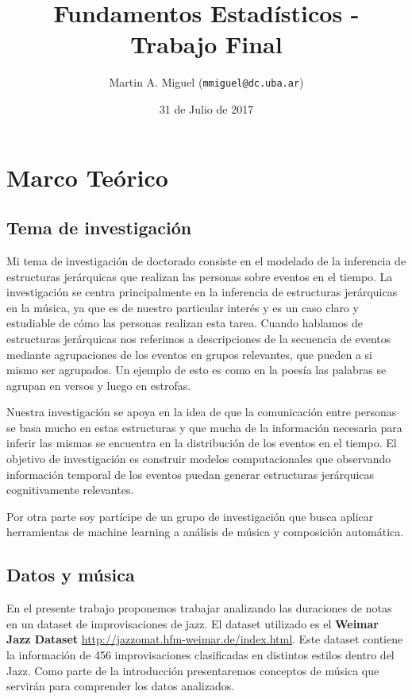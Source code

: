 \documentclass{article}
\title{Fundamentos Estadísticos - Trabajo Final}
\author{Martin A. Miguel (\texttt{mmiguel@dc.uba.ar})}
\affil{Lic. en Cs de la Computación - Laboratorio de Inteligencia Artificial
Aplicada, Depto. de Computación, Fac. de Cs. Exactas y Naturales, Univ. de
Buenos Aires, Buenos Aires, Argentina}
\date{31 de Julio de 2017}
\begin{document}
\maketitle

\section{Marco Teórico}

\subsection{Tema de investigación}

Mi tema de investigación de doctorado consiste en el modelado de la inferencia
de estructuras jerárquicas que realizan las personas sobre eventos en el
tiempo. La investigación se centra principalmente en la inferencia de
estructuras jerárquicas en la música, ya que es de nuestro particular interés y
es un caso claro y estudiable de cómo las personas realizan esta tarea. Cuando
hablamos de estructuras jerárquicas nos referimos a descripciones de la
secuencia de eventos mediante agrupaciones de los eventos en grupos relevantes,
que pueden a si mismo ser agrupados. Un ejemplo de esto es como en la
poesía las palabras se agrupan en versos y luego en estrofas. 

Nuestra investigación se apoya en la idea de que la comunicación entre
personas se basa mucho en estas estructuras y que mucha de la información
necesaria para inferir las mismas se encuentra en la distribución de
los eventos en el tiempo. El objetivo de investigación es construir modelos
computacionales que observando información temporal de los eventos puedan
generar estructuras jerárquicas cognitivamente relevantes.

Por otra parte soy partícipe de un grupo de investigación que busca aplicar
herramientas de machine learning a análisis de música y composición
automática. 

\subsection{Datos y música}

En el presente trabajo proponemos trabajar analizando las duraciones de 
notas en un dataset de improvisaciones de jazz. El dataset utilizado es el
\textbf{Weimar Jazz Dataset} \url{http://jazzomat.hfm-weimar.de/index.html}.
Este dataset contiene la información de 456 improvisaciones clasificadas en
distintos estilos dentro del Jazz. Como parte de la introducción presentaremos
conceptos de música que servirán para comprender los datos analizados.
\end{document}
